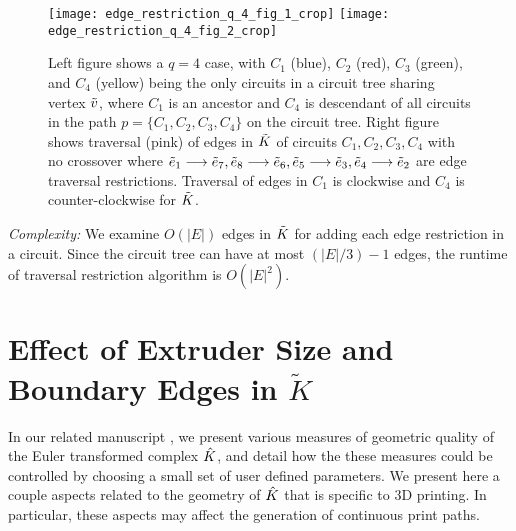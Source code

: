 \begin{figure}[htp!]
	 
	\centering
	\texttt{[image: edge\_restriction\_q\_4\_fig\_1\_crop]}
	\texttt{[image: edge\_restriction\_q\_4\_fig\_2\_crop]}
        \medskip
	\caption{\label{fig:edgerestrictq34}
		Left figure shows a $q=4$ case, with $C_1$ (blue), $C_2$ (red), $C_3$ (green), and $C_4$ (yellow) being the only circuits in a circuit tree sharing vertex $\tilde{v}$, where $C_1$ is an ancestor and $C_4$ is descendant of all circuits in the path $p = \{C_1, C_2, C_3, C_4\}$ on the circuit tree.
		Right figure shows traversal (pink) of edges in $\tilde{K}$ of circuits $C_1, C_2, C_3, C_4$ with no crossover where $\tilde{e}_1 \longrightarrow \tilde{e}_7, \tilde{e}_8 \longrightarrow \tilde{e}_6, \tilde{e}_5 \longrightarrow \tilde{e}_3, \tilde{e}_4 \longrightarrow \tilde{e}_2$ are edge traversal restrictions.
		Traversal of edges in $C_1$ is clockwise and $C_4$ is counter-clockwise for $\tilde{K}$.}

\end{figure}


\noindent \textit{Complexity:} We examine $O(|E|)$ edges in $\tilde{K}$ for adding each edge restriction in a circuit.
Since the circuit tree can have at most $(|E|/3) - 1$ edges, the runtime of traversal restriction algorithm is $O(|E|^2)$.

\section{Effect of Extruder Size and Boundary Edges in $\tilde{K}$}\label{sec:boundaryedges}

In our related manuscript \cite{GuKr2018}, we present various measures of geometric quality of the Euler transformed complex $\hat{K}$, and detail how the these measures could be controlled by choosing a small set of user defined parameters.
We present here a couple aspects related to the geometry of $\hat{K}$ that is specific to 3D printing.
In particular, these aspects may affect the generation of continuous print paths.

